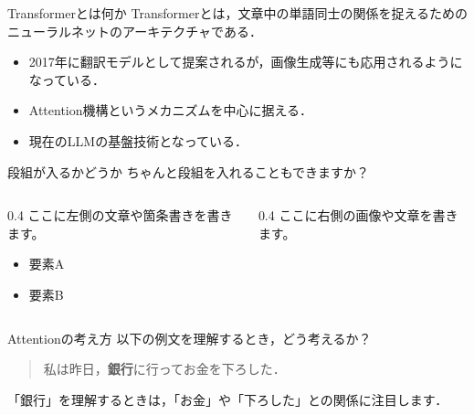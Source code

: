 \documentclass[aspectratio=169,professionalfonts]{beamer}
\begin{document}

\TOCFrame


\begin{frame}{Transformerとは何か}
  Transformerとは，文章中の単語同士の関係を捉えるための
  ニューラルネットのアーキテクチャである．

  \begin{itemize}
    \item 2017年に翻訳モデルとして提案されるが，画像生成等にも応用されるようになっている．
    \item Attention機構というメカニズムを中心に据える．
    \item 現在のLLMの基盤技術となっている．
  \end{itemize}
\end{frame}


\begin{frame}{段組が入るかどうか}
  ちゃんと段組を入れることもできますか？
  
  \begin{columns}
    \centering
    \begin{column}{0.4\textwidth}
      ここに左側の文章や箇条書きを書きます。
      \begin{itemize}
        \item 要素A
        \item 要素B
      \end{itemize}
    \end{column}
    
    \begin{column}{0.4\textwidth}
      ここに右側の画像や文章を書きます。
    \end{column}
  \end{columns}
\end{frame}

\begin{frame}{Attentionの考え方}
  以下の例文を理解するとき，どう考えるか？

  \begin{quote}
    私は昨日，\textbf{銀行}に行ってお金を下ろした．
  \end{quote}

  「銀行」を理解するときは，「お金」や「下ろした」との関係に注目します．
\end{frame}
\end{document}
